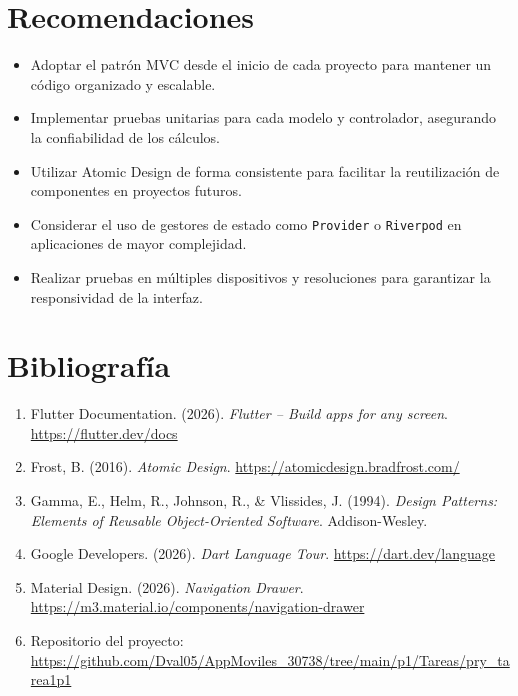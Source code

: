 \documentclass{article}
\begin{document}
\section{Recomendaciones}
\begin{itemize}[label=\small\color{verdeO}$\blacksquare$]
    \item Adoptar el patrón MVC desde el inicio de cada proyecto para mantener un código organizado y escalable.
    \item Implementar pruebas unitarias para cada modelo y controlador, asegurando la confiabilidad de los cálculos.
    \item Utilizar Atomic Design de forma consistente para facilitar la reutilización de componentes en proyectos futuros.
    \item Considerar el uso de gestores de estado como \texttt{Provider} o \texttt{Riverpod} en aplicaciones de mayor complejidad.
    \item Realizar pruebas en múltiples dispositivos y resoluciones para garantizar la responsividad de la interfaz.
\end{itemize}

\section{Bibliografía}
\begin{enumerate}
    \item Flutter Documentation. (2026). \textit{Flutter -- Build apps for any screen}. \url{https://flutter.dev/docs}
    \item Frost, B. (2016). \textit{Atomic Design}. \url{https://atomicdesign.bradfrost.com/}
    \item Gamma, E., Helm, R., Johnson, R., \& Vlissides, J. (1994). \textit{Design Patterns: Elements of Reusable Object-Oriented Software}. Addison-Wesley.
    \item Google Developers. (2026). \textit{Dart Language Tour}. \url{https://dart.dev/language}
    \item Material Design. (2026). \textit{Navigation Drawer}. \url{https://m3.material.io/components/navigation-drawer}
    \item Repositorio del proyecto: \url{https://github.com/Dval05/AppMoviles_30738/tree/main/p1/Tareas/pry_tarea1p1}
\end{enumerate}
\end{document}
